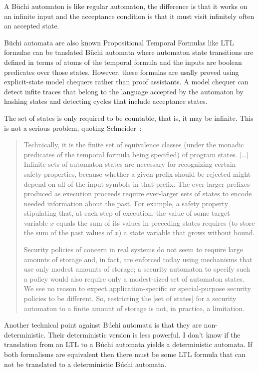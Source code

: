 \documentclass[a4paper,10pt]{article}
\begin{document}
A B\"uchi automaton is like regular automaton, the difference is that it works
on an infinite input and the acceptance condition is that it must visit
infinitely often an accepted state.

B\"uchi automata are also known Propositional Temporal Formulas like LTL
formulae can be tanslated B\"{u}chi automata where automaton state transitions
are defined in terms of atoms of the temporal formula and the inputs are boolean
predicates over those states. However, these formulas are usally proved using
explicit-state model chequers rather than proof assistants. A model chequer can
detect infite traces that belong to the language accepted by the automaton by
hashing states and detecting cycles that include acceptance states.

The set of states is only required to be countable, that is, it may be infinite.
This is not a serious problem, quoting Schneider~\cite{Schneider89}:
\begin{quote}
 Technically, it is the finite set of equivalence classes (under the monadic
predicates of the temporal formula being specified) of program states. [\ldots]
Infinite sets of automaton states are necessary for recognizing certain
safety properties, because whether a given prefix should be rejected might
depend on all of the input symbols in that prefix. The ever-larger prefixes
produced as execution proceeds require ever-larger sets of states to encode
needed information about the past. For example, a safety property stipulating
that, at each step of execution, the value of some target variable $x$ equals
the sum of its values in preceding states requires (to store the sum of the past
values of $x$) a state variable that grows without bound.

Security policies of concern in real systems do not seem to require large
amounts of storage and, in fact, are enforced today using mechanisms that use
only modest amounts of storage; a security automaton to specify such a policy
would also require only a modest-sized set of automaton states. We see no reason
to expect application-specific or special-purpose security policies to be
different. So, restricting the [set of states] for a security automaton to a
finite amount of storage is not, in practice, a limitation.
\end{quote}

Another technical point against B\'uchi automata is that they are
non-deterministic. Their deterministic version is less powerful. I don't know
if the translation from an LTL to a B\'uchi automata yields a deterministic
automata. If both formalisms are equivalent then there must be some LTL formula
that can not be translated to a deterministic B\'uchi automata.
\end{document}
